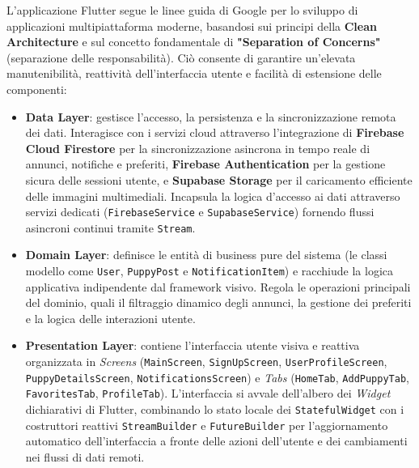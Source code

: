 \documentclass[a4paper]{report}
\begin{document}
L'applicazione Flutter segue le linee guida di Google per lo sviluppo di applicazioni multipiattaforma moderne, basandosi sui principi della \textbf{Clean Architecture} e sul concetto fondamentale di \textbf{"Separation of Concerns"} (separazione delle responsabilità). Ciò consente di garantire un'elevata manutenibilità, reattività dell'interfaccia utente e facilità di estensione delle componenti:
\begin{itemize}
    \item \textbf{Data Layer}: gestisce l'accesso, la persistenza e la sincronizzazione remota dei dati. Interagisce con i servizi cloud attraverso l'integrazione di \textbf{Firebase Cloud Firestore} per la sincronizzazione asincrona in tempo reale di annunci, notifiche e preferiti, \textbf{Firebase Authentication} per la gestione sicura delle sessioni utente, e \textbf{Supabase Storage} per il caricamento efficiente delle immagini multimediali. Incapsula la logica d'accesso ai dati attraverso servizi dedicati (\texttt{FirebaseService} e \texttt{SupabaseService}) fornendo flussi asincroni continui tramite \texttt{Stream}.
    
    \item \textbf{Domain Layer}: definisce le entità di business pure del sistema (le classi modello come \texttt{User}, \texttt{PuppyPost} e \texttt{NotificationItem}) e racchiude la logica applicativa indipendente dal framework visivo. Regola le operazioni principali del dominio, quali il filtraggio dinamico degli annunci, la gestione dei preferiti e la logica delle interazioni utente.
    
    \item \textbf{Presentation Layer}: contiene l'interfaccia utente visiva e reattiva organizzata in \textit{Screens} (\texttt{MainScreen}, \texttt{SignUpScreen}, \texttt{UserProfileScreen}, \texttt{PuppyDetailsScreen}, \texttt{NotificationsScreen}) e \textit{Tabs} (\texttt{HomeTab}, \texttt{AddPuppyTab}, \texttt{FavoritesTab}, \texttt{ProfileTab}). L'interfaccia si avvale dell'albero dei \textit{Widget} dichiarativi di Flutter, combinando lo stato locale dei \texttt{StatefulWidget} con i costruttori reattivi \texttt{StreamBuilder} e \texttt{FutureBuilder} per l'aggiornamento automatico dell'interfaccia a fronte delle azioni dell'utente e dei cambiamenti nei flussi di dati remoti.
\end{itemize}
\vspace{0.5cm}
\end{document}
